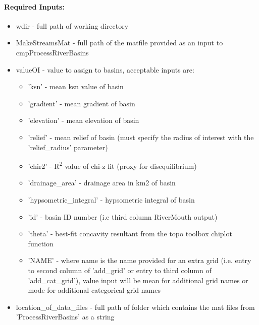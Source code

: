 \paragraph{Required Inputs:}
\begin{itemize}
\item wdir - full path of working directory
\item MakeStreamsMat - full path of the matfile provided as an input to cmpProcessRiverBasins
\item valueOI - value to assign to basins, acceptable inputs are:
\begin{itemize}
\item 'ksn' - mean ksn value of basin
\item 'gradient' - mean gradient of basin
\item 'elevation' - mean elevation of basin
\item 'relief' - mean relief of basin (must specify the radius of interest with the 'relief\_radius' parameter)
\item 'chir2' - R\textsuperscript{2} value of chi-z fit (proxy for disequilibrium)
\item 'drainage\_area' - drainage area in km2 of basin
\item 'hypsometric\_integral' - hypsometric integral of basin
\item 'id' - basin ID number (i.e third column RiverMouth output)
\item 'theta' - best-fit concavity resultant from the topo toolbox chiplot function 
\item 'NAME' - where name is the name provided for an extra grid (i.e. entry to second column of 'add\_grid' or entry to 
third column of 'add\_cat\_grid'), value input will be mean for additional grid names or mode for additional 
categorical grid names
\end{itemize}
\item location\_of\_data\_files - full path of folder which contains the mat files from 'ProcessRiverBasins' as a string
\end{itemize}

